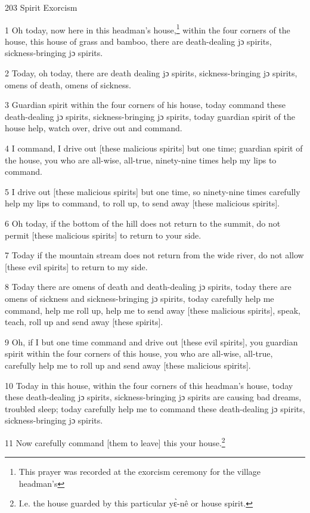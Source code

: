 
203 Spirit Exorcism

1 Oh today, now here in this headman's house,\footnote{This prayer was recorded at the exorcism ceremony for the village headman's} within the four corners of the
house, this house of grass and bamboo, there are death-dealing jɔ spirits, sickness-bringing
jɔ spirits.

2 Today, oh today, there are death dealing jɔ spirits, sickness-bringing jɔ spirits,
omens of death, omens of sickness.

3 Guardian spirit within the four corners of his house, today command these death-dealing
jɔ spirits, sickness-bringing jɔ spirits, today guardian spirit of the house
help, watch over, drive out and command.

4 I command, I drive out [these malicious spirits] but one time; guardian spirit
of the house, you who are all-wise, all-true, ninety-nine times help my lips to
command.

5 I drive out [these malicious spirits] but one time, so ninety-nine times carefully
help my lips to command, to roll up, to send away [these malicious spirits].

6 Oh today, if the bottom of the hill does not return to the summit, do not permit
[these malicious spirits] to return to your side.

7 Today if the mountain stream does not return from the wide river, do not allow
[these evil spirits] to return to my side.

8 Today there are omens of death and death-dealing jɔ spirits, today there are
omens of sickness and sickness-bringing jɔ spirits, today carefully help me command,
help me roll up, help me to send away [these malicious spirits], speak, teach,
roll up and send away [these spirits].

9 Oh, if I but one time command and drive out [these evil spirits], you guardian
spirit within the four corners of this house, you who are all-wise, all-true, carefully
help me to roll up and send away [these malicious spirits].

10 Today in this house, within the four corners of this headman's house, today
these death-dealing jɔ spirits, sickness-bringing jɔ spirits are causing bad
dreams, troubled sleep; today carefully help me to command these death-dealing
jɔ spirits, sickness-bringing jɔ spirits.

11 Now carefully command [them to leave] this your house.\footnote{I.e. the house guarded by this particular yɛ̀-nê or house spirit.}


